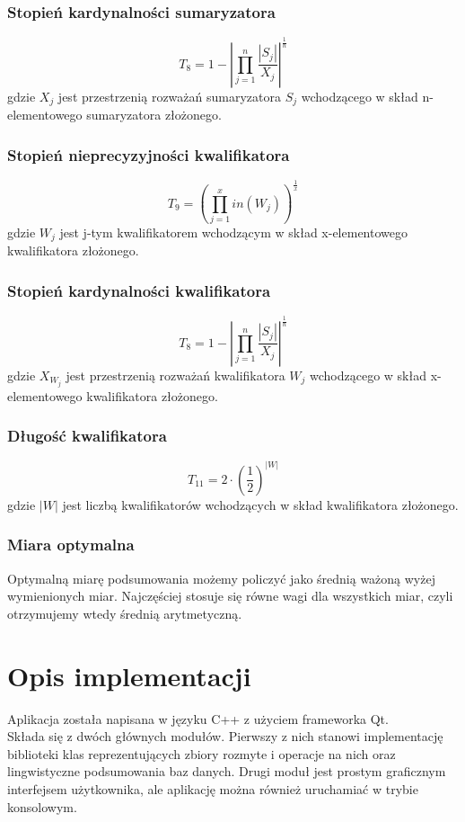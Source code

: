 \documentclass{classrep}
\begin{document}
\subsubsection{Stopień kardynalności sumaryzatora}
\begin{equation}
T_8=1-|\prod_{j=1}^n\frac{|S_j|}{X_j}|^{\frac{1}{n}}
\end{equation}
gdzie $X_j$ jest przestrzenią rozważań sumaryzatora $S_j$ wchodzącego w skład n-elementowego sumaryzatora złożonego.

\subsubsection{Stopień nieprecyzyjności kwalifikatora}
\begin{equation}
T_9=(\prod_{j=1}^x in(W_j))^{\frac{1}{x}}
\end{equation}
gdzie $W_j$ jest j-tym kwalifikatorem wchodzącym w skład x-elementowego kwalifikatora złożonego.  

\subsubsection{Stopień kardynalności kwalifikatora}
\begin{equation}
T_8=1-|\prod_{j=1}^n\frac{|S_j|}{X_j}|^{\frac{1}{n}}
\end{equation}
gdzie $X_{W_j}$ jest przestrzenią rozważań kwalifikatora $W_j$ wchodzącego w skład x-elementowego kwalifikatora złożonego.

\subsubsection{Długość kwalifikatora}
\begin{equation}
T_11=2 \cdot (\frac{1}{2})^{|W|}
\end{equation}
gdzie $|W|$ jest liczbą kwalifikatorów wchodzących w skład kwalifikatora złożonego.

\subsubsection{Miara optymalna}
Optymalną miarę podsumowania możemy policzyć jako średnią ważoną wyżej wymienionych miar. Najczęściej stosuje się równe wagi dla wszystkich miar, czyli otrzymujemy wtedy średnią arytmetyczną.

\section{Opis implementacji}
Aplikacja została napisana w języku C++ z użyciem frameworka Qt.\\
Składa się z dwóch głównych modułów. Pierwszy z nich stanowi implementację biblioteki klas reprezentujących zbiory rozmyte i operacje na nich oraz lingwistyczne podsumowania baz danych. Drugi moduł jest prostym graficznym interfejsem użytkownika, ale aplikację można również uruchamiać w trybie konsolowym.
\end{document}
